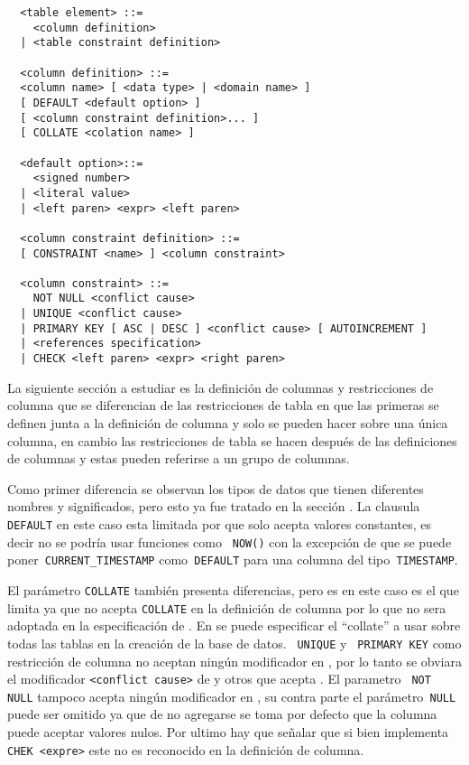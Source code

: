 %
\begin{Verbatim}
  <table element> ::=
    <column definition>
  | <table constraint definition>

  <column definition> ::=
  <column name> [ <data type> | <domain name> ]
  [ DEFAULT <default option> ]
  [ <column constraint definition>... ]
  [ COLLATE <colation name> ]

  <default option>::=
    <signed number>
  | <literal value>
  | <left paren> <expr> <left paren>
  
  <column constraint definition> ::=
  [ CONSTRAINT <name> ] <column constraint>

  <column constraint> ::=
    NOT NULL <conflict cause>
  | UNIQUE <conflict cause>
  | PRIMARY KEY [ ASC | DESC ] <conflict cause> [ AUTOINCREMENT ]
  | <references specification>
  | CHECK <left paren> <expr> <right paren>
\end{Verbatim}
%
La siguiente sección a estudiar es la definición de columnas y restricciones de columna que se diferencian de las restricciones de tabla en que las primeras se definen junta a la definición de columna y solo se pueden hacer sobre una única columna, en cambio las restricciones de tabla se hacen después de las definiciones de columnas y estas pueden referirse a un grupo de columnas.

Como primer diferencia se observan los tipos de datos que tienen diferentes nombres y significados, pero esto ya fue tratado en la sección . La clausula\verb= DEFAULT= en este caso esta limitada por \m que solo acepta valores constantes, es decir no se podría usar funciones como \verb= NOW()= con la excepción de que se puede poner\verb= CURRENT_TIMESTAMP= como\verb= DEFAULT= para una columna del tipo\verb= TIMESTAMP=.

El parámetro \verb=COLLATE= también presenta diferencias, pero es en este caso es \p el que limita ya que no acepta \verb=COLLATE= en la definición de columna por lo que no sera adoptada en la especificación de \jj. En \p se puede especificar el ``collate'' a usar sobre todas las tablas en la creación de la base de datos. \verb= UNIQUE= y \verb= PRIMARY KEY= como restricción de columna no aceptan ningún modificador en \m, por lo tanto se obviara el modificador \verb=<conflict cause>= de \s y otros que acepta \p. El parametro \verb= NOT NULL= tampoco acepta ningún modificador en \m, su contra parte el parámetro\verb= NULL= puede ser omitido ya que de no agregarse se toma por defecto que la columna puede aceptar valores nulos. Por ultimo hay que señalar que \m si bien implementa\verb= CHEK <expre>= este no es reconocido en la definición de columna.

